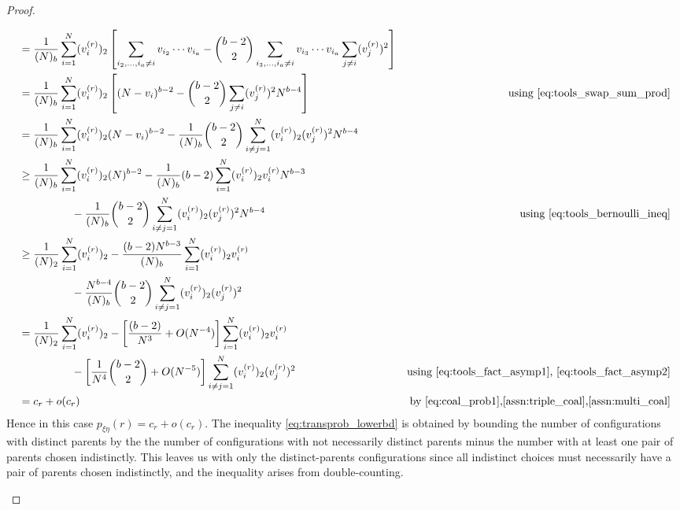 \documentclass{article}
\begin{document}
\begin{proof}
\begin{enumerate}[label = \textbf{Case \arabic*.}]
\begin{align}
&= \frac{1}{(N)_b} \sum_{i=1}^N (v_i^{(r)})_2 \left[ \sum_{i_2,\dots,i_a\neq i} v_{i_2}\cdots v_{i_a} - \binom{b-2}{2} \sum_{i_3,\dots,i_a\neq i} v_{i_3}\cdots v_{i_a} \sum_{j \neq i} (v_j^{(r)})^2 \right] & \notag\\
&= \frac{1}{(N)_b} \sum_{i=1}^N (v_i^{(r)})_2 \left[ (N-v_i)^{b-2} - \binom{b-2}{2} \sum_{j\neq i} (v_j^{(r)})^2 N^{b-4} \right] &\text{using \eqref{eq:tools_swap_sum_prod}} \notag\\
&= \frac{1}{(N)_b} \sum_{i=1}^N (v_i^{(r)})_2  (N-v_i)^{b-2} - \frac{1}{(N)_b} \binom{b-2}{2} \sum_{i\neq j=1}^{N} (v_i^{(r)})_2 (v_j^{(r)})^2 N^{b-4} & \notag\\
&\geq \frac{1}{(N)_b} \sum_{i=1}^N (v_i^{(r)})_2  (N)^{b-2} - \frac{1}{(N)_b}(b-2)\sum_{i=1}^{N} (v_i^{(r)})_2 v_i^{(r)} N^{b-3} \notag\\
&\phantom{=\qquad\qquad} - \frac{1}{(N)_b}\binom{b-2}{2} \sum_{i\neq j=1}^{N} (v_i^{(r)})_2 (v_j^{(r)})^2 N^{b-4} &\text{using \eqref{eq:tools_bernoulli_ineq}} \notag\\
&\geq \frac{1}{(N)_2} \sum_{i=1}^N (v_i^{(r)})_2 - \frac{(b-2)N^{b-3}}{(N)_b}\sum_{i=1}^{N} (v_i^{(r)})_2 v_i^{(r)} \notag\\
&\phantom{=\qquad\qquad} -\frac{N^{b-4}}{(N)_b}\binom{b-2}{2} \sum_{i\neq j=1}^{N} (v_i^{(r)})_2 (v_j^{(r)})^2 & \notag\\
&= \frac{1}{(N)_2} \sum_{i=1}^N (v_i^{(r)})_2 - \left[\frac{(b-2)}{N^3} +O(N^{-4}) \right] \sum_{i=1}^{N} (v_i^{(r)})_2 v_i^{(r)} \notag\\
&\phantom{=\qquad\qquad} -\left[ \frac{1}{N^4}\binom{b-2}{2} + O(N^{-5}) \right] \sum_{i\neq j=1}^{N} (v_i^{(r)})_2 (v_j^{(r)})^2 &\text{using \eqref{eq:tools_fact_asymp1}, \eqref{eq:tools_fact_asymp2}} \\
&= c_r + o(c_r) &\text{by \eqref{eq:coal_prob1},\ref{assn:triple_coal},\ref{assn:multi_coal}} \notag
\end{align}
Hence in this case $p_{\xi\eta}(r)=c_r +o(c_r)$.
The inequality \eqref{eq:transprob_lowerbd} is obtained by bounding the number of configurations with distinct parents by the the number of configurations with not necessarily distinct parents minus the number with at least one pair of parents chosen indistinctly. This leaves us with only the distinct-parents configurations since all indistinct choices must necessarily have a pair of parents chosen indistinctly, and the inequality arises from double-counting.


\end{enumerate}
\end{proof}
\end{document}
